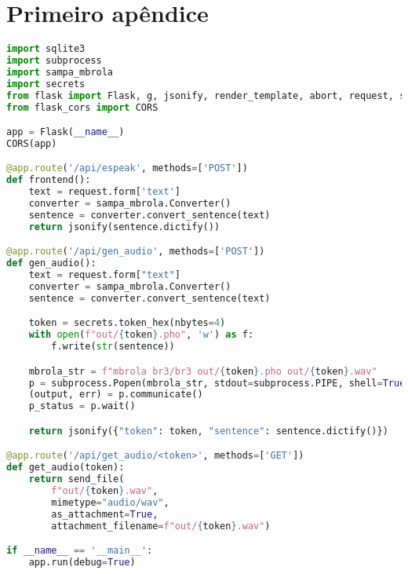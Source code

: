 \apendice
\chapter{Primeiro apêndice}

\begin{lstlisting}[caption=Servidor, label=servidor, language=Python]
import sqlite3
import subprocess
import sampa_mbrola
import secrets
from flask import Flask, g, jsonify, render_template, abort, request, send_file
from flask_cors import CORS

app = Flask(__name__)
CORS(app)

@app.route('/api/espeak', methods=['POST'])
def frontend():
    text = request.form['text']
    converter = sampa_mbrola.Converter()
    sentence = converter.convert_sentence(text)
    return jsonify(sentence.dictify())

@app.route('/api/gen_audio', methods=['POST'])
def gen_audio():
    text = request.form["text"]
    converter = sampa_mbrola.Converter()
    sentence = converter.convert_sentence(text)

    token = secrets.token_hex(nbytes=4)
    with open(f"out/{token}.pho", 'w') as f:
        f.write(str(sentence))

    mbrola_str = f"mbrola br3/br3 out/{token}.pho out/{token}.wav"
    p = subprocess.Popen(mbrola_str, stdout=subprocess.PIPE, shell=True)
    (output, err) = p.communicate()
    p_status = p.wait()

    return jsonify({"token": token, "sentence": sentence.dictify()})

@app.route('/api/get_audio/<token>', methods=['GET'])
def get_audio(token):
    return send_file(
        f"out/{token}.wav",
        mimetype="audio/wav",
        as_attachment=True,
        attachment_filename=f"out/{token}.wav")

if __name__ == '__main__':
    app.run(debug=True)
\end{lstlisting}

